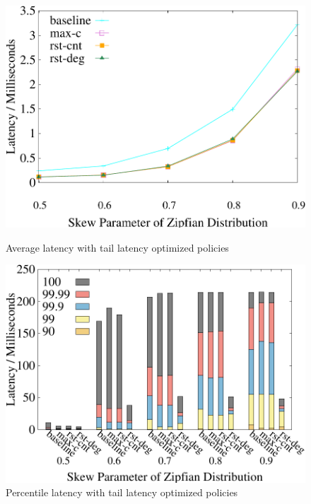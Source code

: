 \begin{figure}[t]
    \centering
    \begin{minipage}[b]{0.32\linewidth}
	\centering
	\includegraphics[width=\textwidth]{./exp_fig/restart/latency}
	\vspace{-2em}
	\caption{Average latency with tail latency optimized policies}
	\label{fig:restart:abort}
	\end{minipage}
    \begin{minipage}[b]{0.32\linewidth}
	\centering
	\includegraphics[width=\textwidth]{./exp_fig/restart/percent100_latency}
	\vspace{-2em}
	\caption{Percentile latency with tail latency optimized policies}
	\label{fig:restart:p100}
	\end{minipage}

\end{figure}
